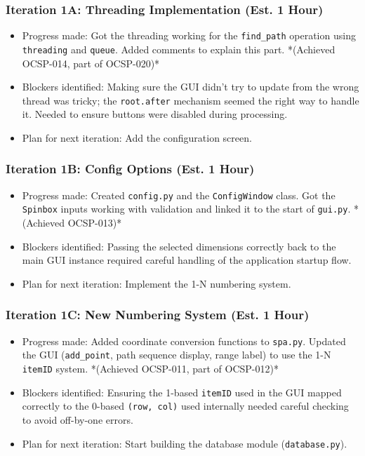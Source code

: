 \subsubsection{Iteration 1A: Threading Implementation (Est. 1 Hour)}
\begin{itemize}
	\item Progress made: Got the threading working for the \verb|find_path| operation using \verb|threading| and \verb|queue|. Added comments to explain this part. *(Achieved OCSP-014, part of OCSP-020)*
	\item Blockers identified: Making sure the GUI didn't try to update from the wrong thread was tricky; the \verb|root.after| mechanism seemed the right way to handle it. Needed to ensure buttons were disabled during processing.
	\item Plan for next iteration: Add the configuration screen.
\end{itemize}

\subsubsection{Iteration 1B: Config Options (Est. 1 Hour)}
\begin{itemize}
	\item Progress made: Created \verb|config.py| and the \verb|ConfigWindow| class. Got the \verb|Spinbox| inputs working with validation and linked it to the start of \verb|gui.py|. *(Achieved OCSP-013)*
	\item Blockers identified: Passing the selected dimensions correctly back to the main GUI instance required careful handling of the application startup flow.
	\item Plan for next iteration: Implement the 1-N numbering system.
\end{itemize}

\subsubsection{Iteration 1C: New Numbering System (Est. 1 Hour)}
\begin{itemize}
	\item Progress made: Added coordinate conversion functions to \verb|spa.py|. Updated the GUI (\verb|add_point|, path sequence display, range label) to use the 1-N \verb|itemID| system. *(Achieved OCSP-011, part of OCSP-012)*
	\item Blockers identified: Ensuring the 1-based \verb|itemID| used in the GUI mapped correctly to the 0-based \verb|(row, col)| used internally needed careful checking to avoid off-by-one errors.
	\item Plan for next iteration: Start building the database module (\verb|database.py|).
\end{itemize}

